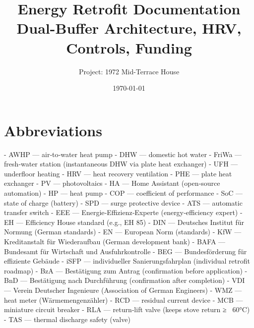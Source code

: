 \documentclass[11pt,oneside]{report}
\title{Energy Retrofit Documentation\\Dual-Buffer Architecture, HRV, Controls, Funding}
\author{Project: 1972 Mid-Terrace House}
\date{\today}
\begin{document}
\maketitle
\setcounter{secnumdepth}{3}
\setcounter{tocdepth}{3}
\tableofcontents
\clearpage

\chapter{Abbreviations}
\begin{markdown}
- AWHP — air‑to‑water heat pump
- DHW — domestic hot water
- FriWa — fresh‑water station (instantaneous DHW via plate heat exchanger)
- UFH — underfloor heating
- HRV — heat recovery ventilation
- PHE — plate heat exchanger
- PV — photovoltaics
- HA — Home Assistant (open‑source automation)
- HP — heat pump
- COP — coefficient of performance
- SoC — state of charge (battery)
- SPD — surge protective device
- ATS — automatic transfer switch
- EEE — Energie‑Effizienz‑Experte (energy‑efficiency expert)
- EH — Efficiency House standard (e.g., EH 85)
- DIN — Deutsches Institut für Normung (German standards)
- EN — European Norm (standards)
- KfW — Kreditanstalt für Wiederaufbau (German development bank)
- BAFA — Bundesamt für Wirtschaft und Ausfuhrkontrolle
- BEG — Bundesförderung für effiziente Gebäude
- iSFP — individueller Sanierungsfahrplan (individual retrofit roadmap)
- BzA — Bestätigung zum Antrag (confirmation before application)
- BnD — Bestätigung nach Durchführung (confirmation after completion)
- VDI — Verein Deutscher Ingenieure (Association of German Engineers)
- WMZ — heat meter (Wärmemengenzähler)
- RCD — residual current device
- MCB — miniature circuit breaker
- RLA — return‑lift valve (keeps stove return ≥ ~60°C)
- TAS — thermal discharge safety (valve)
\end{markdown}
\end{document}
